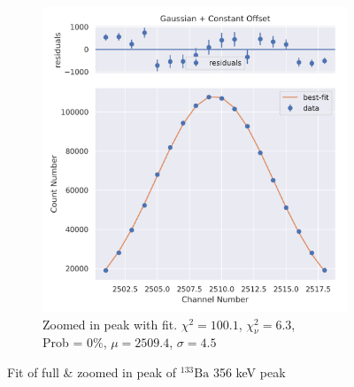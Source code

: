 \documentclass[11pt,a4paper]{article}
\newcommand{\element}[2]{$^{#2}\textrm{#1}$}
\begin{document}
\begin{figure}[H]
\begin{subfigure}{.5\linewidth}
    \includegraphics[width=\linewidth]{./Images/Barium133/Gauss/Gauss_6_Zoom.png}
    \caption{Zoomed in peak with fit. $\chi^2 = 100.1$, $\chi^2_\nu = 6.3$, \\ Prob = 0\%, $\mu = 2509.4$, $\sigma = 4.5$}
  \end{subfigure}
  \caption{Fit of full \& zoomed in peak of \element{Ba}{133} 356 keV peak}
\end{figure}
\end{document}
